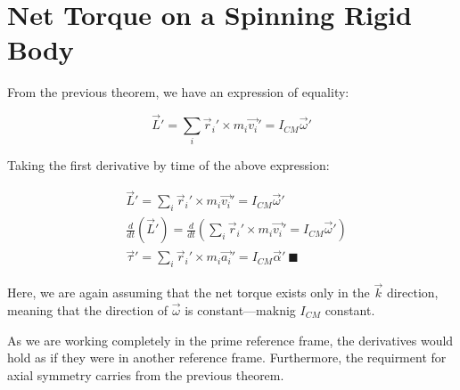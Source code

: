 \documentclass[letterpaper]{article}
\begin{document}
\section{Net Torque on a Spinning Rigid Body}
\label{sec:org6fa41c3}
From the previous theorem, we have an expression of equality:

\begin{equation}
    \vec{L}' = \sum_i \vec{r}_i' \times m_i \vec{v_i}'= I_{CM} \vec{\omega}' 
\end{equation}

Taking the first derivative by time of the above expression:

\begin{align}
    &\vec{L}' = \sum_i \vec{r}_i' \times m_i \vec{v_i}'= I_{CM} \vec{\omega}'\\
    &\frac{d}{dt}\left(\vec{L}'\right) = \frac{d}{dt}\left(\sum_i \vec{r}_i' \times m_i \vec{v_i}'= I_{CM} \vec{\omega}'\right)\\
    &\vec{\tau}' = \sum_i \vec{r}_i' \times m_i \vec{a_i}'= I_{CM} \vec{\alpha}'\ \blacksquare
\end{align}

Here, we are again assuming that the net torque exists only in the \(\vec{k}\) direction, meaning that the direction of \(\vec{\omega}\) is constant---maknig \(I_{CM}\) constant.

As we are working completely in the prime reference frame, the derivatives would hold as if they were in another reference frame. Furthermore, the requirment for axial symmetry carries from the previous theorem.
\end{document}
